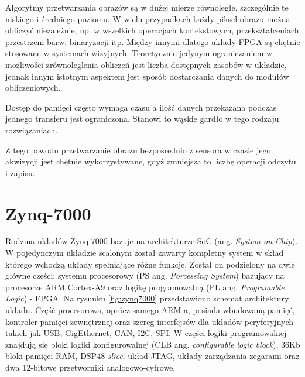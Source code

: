 Algorytmy przetwarzania obrazów są w dużej mierze równoległe, szczególnie te niskiego i średniego poziomu. W wielu przypadkach każdy piksel obrazu można obliczyć niezależnie, np. w wszelkich operacjach kontekstowych, przekształceniach przestrzeni barw, binaryzacji itp. Między innymi dlatego układy FPGA są chętnie stosowane w systemach wizyjnych. Teoretycznie jedynym ograniczaniem w możliwości zrównoleglenia obliczeń jest liczba dostępnych zasobów w układzie, jednak innym istotnym aspektem jest sposób dostarczania danych do modułów obliczeniowych. 

Dostęp do pamięci często wymaga czasu a ilość danych przekazana podczas jednego transferu jest ograniczona. Stanowi to wąskie gardło w tego rodzaju rozwiązaniach.

Z tego powodu przetwarzanie obrazu bezpośrednio z sensora w czasie jego akwizycji jest chętnie wykorzystywane, gdyż zmniejsza to liczbę operacji odczytu i zapisu. \cite{garcia2014survey}




\section{Zynq-7000}

Rodzina układów Zynq-7000 bazuje na architekturze SoC (ang. \textit{System on Chip}). W pojedynczym układzie scalonym został zawarty kompletny system w skład którego wchodzą układy spełniające różne funkcje. Został on podzielony na dwie główne części: systemu procesorowy (PS ang. \textit{Porcessing System}) bazujący na procesorze ARM Cortex-A9 oraz logikę programowalną (PL ang. \textit{Programable Logic}) - FPGA. %
Na rysunku \ref{fig:zynq7000} przedstawiono schemat architektury układu. %
Część procesorowa, oprócz samego ARM-a, posiada wbudowaną pamięć, kontroler pamięci zewnętrznej oraz szereg interfejsów dla układów peryferyjnych takich jak USB, GigEthernet, CAN, I2C, SPI. %
W części logiki programowalnej znajdują się bloki logiki konfigurowalnej (CLB ang. \textit{configurable logic block}), 36Kb bloki pamięci RAM, DSP48 \textit{slice}, układ JTAG, układy zarządzania zegarami oraz dwa 12-bitowe przetworniki analogowo-cyfrowe.

